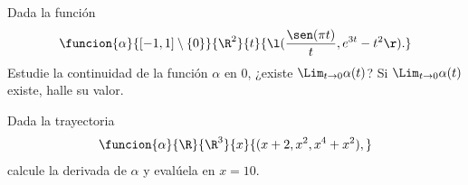 \documentclass[a4,11pt]{aleph-examen}
\begin{document}
\begin{preguntas}
\item
    Dada la función
    \[
        \funcion{\alpha}{[-1,1]\setminus\{0\}}{\R^2}{t}{\l(\dfrac{\sen(\pi t)}t,e^{3t}-t^2\r).}
    \]
    Estudie la continuidad de la función $\alpha$ en $0$, ¿existe $\Lim_{t\to 0} \alpha(t)$? Si $\Lim_{t\to 0} \alpha(t)$ existe, halle su valor.


\item
    Dada la trayectoria
	\[
        \funcion{\alpha}{\R}{\R^3}{x}{(x+2,x^2,x^4+x^2),} 
    \]
    calcule la derivada de $\alpha$ y evalúela en $x=10$.
    


\end{preguntas}
\end{document}
